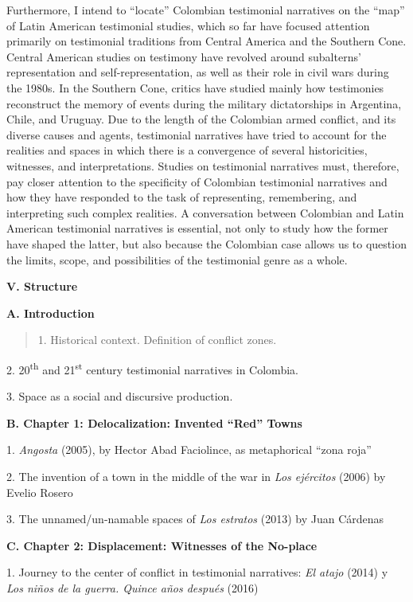 \documentclass[
  11pt,
,
onecolumn,
openany
]{book}
\begin{document}
Furthermore, I intend to ``locate'' Colombian testimonial narratives on the
``map'' of Latin American testimonial studies, which so far have focused
attention primarily on testimonial traditions from Central America and the
Southern Cone. Central American studies on testimony have revolved around
subalterns' representation and self-representation, as well as their role in
civil wars during the 1980s. In the Southern Cone, critics have studied mainly
how testimonies reconstruct the memory of events during the military
dictatorships in Argentina, Chile, and Uruguay. Due to the length of the
Colombian armed conflict, and its diverse causes and agents, testimonial
narratives have tried to account for the realities and spaces in which there
is a convergence of several historicities, witnesses, and interpretations.
Studies on testimonial narratives must, therefore, pay closer attention to the
specificity of Colombian testimonial narratives and how they have responded to
the task of representing, remembering, and interpreting such complex
realities. A conversation between Colombian and Latin American testimonial
narratives is essential, not only to study how the former have shaped the
latter, but also because the Colombian case allows us to question the limits,
scope, and possibilities of the testimonial genre as a whole.

\textbf{V. Structure}

\textbf{A. Introduction}

\begin{quote}
1. Historical context. Definition of conflict zones.
\end{quote}

2. 20\textsuperscript{th} and 21\textsuperscript{st} century testimonial
narratives in Colombia.

3. Space as a social and discursive production.

\textbf{B. Chapter 1: Delocalization: Invented ``Red'' Towns}

1. \emph{Angosta} (2005), by Hector Abad Faciolince, as metaphorical ``zona
roja''

2. The invention of a town in the middle of the war in \emph{Los ejércitos}
(2006) by Evelio Rosero

3. The unnamed/un-namable spaces of \emph{Los estratos} (2013) by Juan
Cárdenas~

\textbf{C. Chapter 2: Displacement: Witnesses of the No-place}

1. Journey to the center of conflict in testimonial narratives: \emph{El
atajo} (2014) y \emph{Los niños de la guerra. Quince años después} (2016)~
\end{document}
